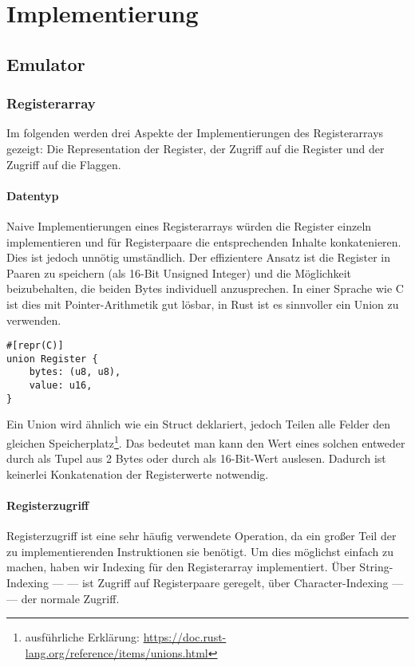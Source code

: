 \chapter{Implementierung}\label{chap:impl}

\section{Emulator}

\subsection{Registerarray}

Im folgenden werden drei Aspekte der Implementierungen des Registerarrays gezeigt: Die Representation der Register, der Zugriff auf die Register und der Zugriff auf die Flaggen.

\subsubsection{Datentyp}

Naive Implementierungen eines Registerarrays würden die Register einzeln implementieren und für Registerpaare die entsprechenden Inhalte konkatenieren.
Dies ist jedoch unnötig umständlich. Der effizientere Ansatz ist die Register in Paaren zu speichern (als 16-Bit Unsigned Integer) und die Möglichkeit beizubehalten, die beiden Bytes individuell anzusprechen. In einer Sprache wie C ist dies mit Pointer-Arithmetik gut lösbar, in Rust ist es sinnvoller ein Union zu verwenden.

\begin{verbatim}
#[repr(C)]
union Register {
    bytes: (u8, u8),
    value: u16,
}
\end{verbatim}

Ein Union wird ähnlich wie ein Struct deklariert, jedoch Teilen alle Felder den gleichen Speicherplatz\footnote{ausführliche Erklärung: \url{https://doc.rust-lang.org/reference/items/unions.html}}. Das bedeutet man kann den Wert eines solchen  entweder durch  als Tupel aus 2 Bytes oder durch  als 16-Bit-Wert auslesen. Dadurch ist keinerlei Konkatenation der Registerwerte notwendig.

\subsubsection{Registerzugriff}

Registerzugriff ist eine sehr häufig verwendete Operation, da ein großer Teil der zu implementierenden Instruktionen sie benötigt. Um dies möglichst einfach zu machen, haben wir Indexing für den Registerarray implementiert. Über String-Indexing ---  --- ist Zugriff auf Registerpaare geregelt, über Character-Indexing ---  --- der normale Zugriff.

